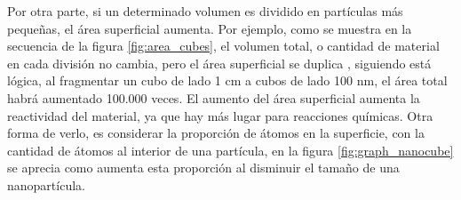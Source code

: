 Por otra parte, si un determinado volumen es dividido en partículas más pequeñas, el área superficial aumenta. Por ejemplo, como se muestra en la secuencia de la figura \ref{fig:area_cubes}, el volumen total, o cantidad de material en cada división no cambia, pero el área superficial se duplica \footnotemark, siguiendo está lógica, al fragmentar un cubo de lado 1 cm a cubos de lado 100 nm, el área total habrá aumentado 100.000 veces. El aumento del área superficial aumenta la reactividad del material, ya que hay más lugar para reacciones químicas. Otra forma de verlo, es considerar la proporción de átomos en la superficie, con la cantidad de átomos al interior de una partícula, en la figura \ref{fig:graph_nanocube} se aprecia como aumenta esta proporción al disminuir el tamaño de una nanopartícula.


